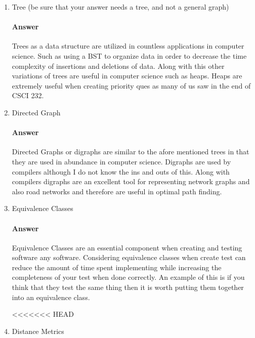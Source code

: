 \documentclass{article}
\begin{document}
\begin{enumerate}

    \item Tree (be sure that your answer needs a tree, and not a general graph)

        \paragraph{Answer}

        Trees as a data structure are utilized in countless applications in computer
        science. Such as using a BST to organize data in order to decrease the time
        complexity of insertions and deletions of data. Along with this other variations
        of trees are useful in computer science such as heaps. Heaps are extremely useful
        when creating priority ques as many of us saw in the end of CSCI 232.

    \item Directed Graph

        \paragraph{Answer}

        Directed Graphs or digraphs are similar to the afore mentioned trees in that they are used
        in abundance in computer science. Digraphs are used by compilers although I do not know the ins and outs of this.
        Along with compilers digraphs are an excellent tool for representing network graphs
        and also road networks and therefore are useful in optimal path finding.

    \item Equivalence Classes

        \paragraph{Answer}

        Equivalence Classes are an essential component when creating and testing software
        any software. Considering equivalence classes when create test can reduce the amount of
        time spent implementing while increasing the completeness of your test when done
        correctly. An example of this is if you think that they test the same thing then it is worth
        putting them together into an equivalence class.

<<<<<<< HEAD
    \item Distance Metrics


\end{enumerate}
\end{document}
